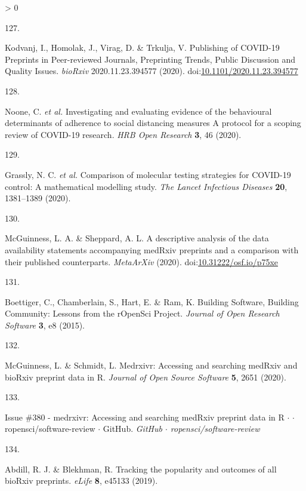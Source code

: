 \documentclass[a4paper, twoside]{templates/ociamthesis}
\newlength{\cslhangindent}
\newlength{\csllabelwidth}
\newenvironment{CSLReferences}[3] %
 {%
  \setlength{\parindent}{0pt}
  \ifodd #1 \everypar{\setlength{\hangindent}{\cslhangindent}}\ignorespaces\fi
  \ifnum #2 > 0
  \setlength{\parskip}{#2\baselineskip}
  \fi
 }%
 {}
\newcommand{\CSLLeftMargin}[1]{\parbox[t]{\maxof{\widthof{#1}}{\csllabelwidth}}{#1}}
\newcommand{\CSLRightInline}[1]{\parbox[t]{\linewidth - \csllabelwidth}{#1}}
\begin{document}
\begin{CSLReferences}{0}{0}
\leavevmode\hypertarget{ref-kodvanj2020}{}%
\CSLLeftMargin{127. }
\CSLRightInline{Kodvanj, I., Homolak, J., Virag, D. \& Trkulja, V. Publishing of {COVID}-19 {Preprints} in {Peer}-reviewed {Journals}, {Preprinting Trends}, {Public Discussion} and {Quality Issues}. \emph{bioRxiv} 2020.11.23.394577 (2020). doi:\href{https://doi.org/10.1101/2020.11.23.394577}{10.1101/2020.11.23.394577}}

\leavevmode\hypertarget{ref-noone2020}{}%
\CSLLeftMargin{128. }
\CSLRightInline{Noone, C. \emph{et al.} Investigating and evaluating evidence of the behavioural determinants of adherence to social distancing measures {} {A} protocol for a scoping review of {COVID}-19 research. \emph{HRB Open Research} \textbf{3}, 46 (2020).}

\leavevmode\hypertarget{ref-grassly2020}{}%
\CSLLeftMargin{129. }
\CSLRightInline{Grassly, N. C. \emph{et al.} Comparison of molecular testing strategies for {COVID}-19 control: A mathematical modelling study. \emph{The Lancet Infectious Diseases} \textbf{20}, 1381--1389 (2020).}

\leavevmode\hypertarget{ref-mcguinness2020DAScomparison}{}%
\CSLLeftMargin{130. }
\CSLRightInline{McGuinness, L. A. \& Sheppard, A. L. A descriptive analysis of the data availability statements accompanying {medRxiv} preprints and a comparison with their published counterparts. \emph{MetaArXiv} (2020). doi:\href{https://doi.org/10.31222/osf.io/p75xe}{10.31222/osf.io/p75xe}}

\leavevmode\hypertarget{ref-boettiger2015}{}%
\CSLLeftMargin{131. }
\CSLRightInline{Boettiger, C., Chamberlain, S., Hart, E. \& Ram, K. Building {Software}, {Building Community}: Lessons from the {rOpenSci Project}. \emph{Journal of Open Research Software} \textbf{3}, e8 (2015).}

\leavevmode\hypertarget{ref-mcguinness2020medrxivr}{}%
\CSLLeftMargin{132. }
\CSLRightInline{McGuinness, L. \& Schmidt, L. Medrxivr: Accessing and searching {medRxiv} and {bioRxiv} preprint data in {R}. \emph{Journal of Open Source Software} \textbf{5}, 2651 (2020).}

\leavevmode\hypertarget{ref-zotero-15016}{}%
\CSLLeftMargin{133. }
\CSLRightInline{Issue \#380 - medrxivr: Accessing and searching {medRxiv} preprint data in {R} {\(\cdot\)} {\(\cdot\)} ropensci/software-review {\(\cdot\)} {GitHub}. \emph{GitHub {\(\cdot\)} ropensci/software-review}}

\leavevmode\hypertarget{ref-abdill2019popularity}{}%
\CSLLeftMargin{134. }
\CSLRightInline{Abdill, R. J. \& Blekhman, R. Tracking the popularity and outcomes of all {bioRxiv} preprints. \emph{eLife} \textbf{8}, e45133 (2019).}


\end{CSLReferences}
\end{document}
